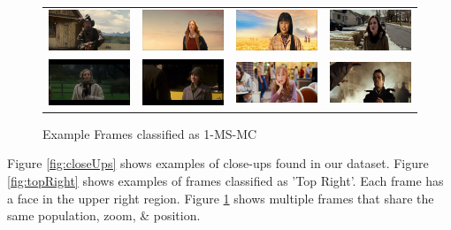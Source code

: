 \begin{figure}
\begin{center}
\begin{tabular}{cccc}
\includegraphics[width=0.2\linewidth]
  {fig/clust/09.jpg} 
& \includegraphics[width=0.2\linewidth]
  {fig/clust/10.jpg}  
& \includegraphics[width=0.2\linewidth]
  {fig/clust/11.jpg}   
& \includegraphics[width=0.2\linewidth]
  {fig/clust/12.jpg}
\\
\includegraphics[width=0.2\linewidth]
  {fig/clust/03.jpg} 
& \includegraphics[width=0.2\linewidth]
  {fig/clust/04.jpg}  
& \includegraphics[width=0.2\linewidth]
  {fig/clust/15.jpg}   
& \includegraphics[width=0.2\linewidth]
  {fig/clust/16.jpg}
\\
\end{tabular}
\end{center}
   \caption{Example Frames classified as 1-MS-MC}
\label{fig:cluster}
\end{figure}

Figure \ref{fig:closeUps} shows examples of close-ups found in our dataset.
Figure \ref{fig:topRight} shows examples of frames classified as 'Top Right'. Each frame has a face in the upper right region.
Figure \ref{fig:cluster} shows multiple frames that share the same population, zoom, \& position.

